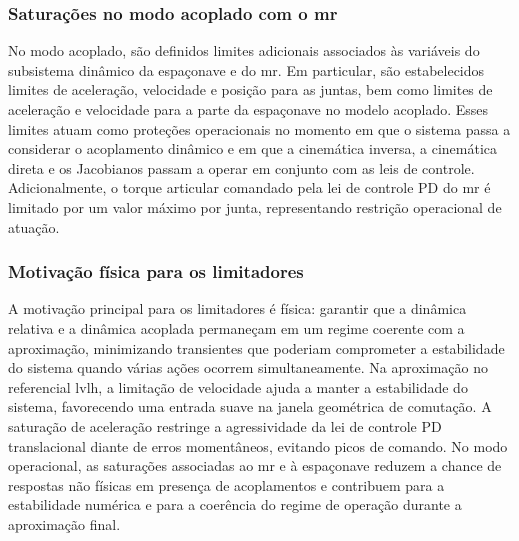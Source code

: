 \subsubsection{Saturações no modo acoplado com o \gls{mr}}
\label{subsubsec:saturacoes_modo_acoplado_mr}

No modo acoplado, são definidos limites adicionais associados às variáveis do subsistema dinâmico da espaçonave e do \gls{mr}.
Em particular, são estabelecidos limites de aceleração, velocidade e posição para as juntas, bem como limites de aceleração e velocidade para a parte da espaçonave no modelo acoplado.
Esses limites atuam como proteções operacionais no momento em que o sistema passa a considerar o acoplamento dinâmico e em que a cinemática inversa, a cinemática direta e os Jacobianos passam a operar em conjunto com as leis de controle.
Adicionalmente, o torque articular comandado pela lei de controle PD do \gls{mr} é limitado por um valor máximo por junta, representando restrição operacional de atuação.

\subsubsection{Motivação física para os limitadores}
\label{subsubsec:motivacao_fisica_limitadores}

A motivação principal para os limitadores é física: garantir que a dinâmica relativa e a dinâmica acoplada permaneçam em um regime coerente com a aproximação, minimizando transientes que poderiam comprometer a estabilidade do sistema quando várias ações ocorrem simultaneamente.
Na aproximação no referencial \gls{lvlh}, a limitação de velocidade ajuda a manter a estabilidade do sistema, favorecendo uma entrada suave na janela geométrica de comutação.
A saturação de aceleração restringe a agressividade da lei de controle PD translacional diante de erros momentâneos, evitando picos de comando.
No modo operacional, as saturações associadas ao \gls{mr} e à espaçonave reduzem a chance de respostas não físicas em presença de acoplamentos e contribuem para a estabilidade numérica e para a coerência do regime de operação durante a aproximação final.